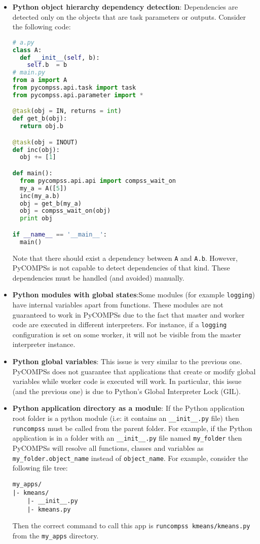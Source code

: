\begin{itemize}
\item \textbf{Python object hierarchy dependency detection}: \newline Dependencies are detected only on the objects that are task 
parameters or outputs. Consider the following code:
\begin{lstlisting}[language=python]
# a.py
class A:
  def __init__(self, b):
    self.b  = b
# main.py
from a import A
from pycompss.api.task import task
from pycompss.api.parameter import *

@task(obj = IN, returns = int)
def get_b(obj):
  return obj.b

@task(obj = INOUT)
def inc(obj):
  obj += [1]

def main():
  from pycompss.api.api import compss_wait_on
  my_a = A([5])
  inc(my_a.b)
  obj = get_b(my_a)
  obj = compss_wait_on(obj)
  print obj

if __name__ == '__main__':
  main()            
\end{lstlisting}
Note that there should exist a dependency between \verb|A| and \verb|A.b|. However, PyCOMPSs is not capable
to detect dependencies of that kind. These dependencies
must be handled (and avoided) manually.

\item \textbf{Python modules with global states}:\newline Some modules (for example \verb|logging|) have internal variables apart from functions. 
These modules are not guaranteed to work in PyCOMPSs due to the fact that master and worker code are executed in different interpreters. For instance, if a \verb|logging| configuration is set on some
worker, it will not be visible from the master interpreter instance.

\item \textbf{Python global variables}:\newline
This issue is very similar to the previous one. PyCOMPSs does not guarantee that applications that create or modify global variables while
worker code is executed will work. In particular, this issue (and the previous one) is due to Python's Global Interpreter Lock (GIL).

\item \textbf{Python application directory as a module}:\newline
If the Python application root folder is a python module (i.e: it contains an \verb|__init__.py| file) then \verb|runcompss| must be called from
the parent folder. For example, if the Python application is in a folder with an \verb|__init__.py| file named \verb|my_folder| then PyCOMPSs will
resolve all functions, classes and variables as \verb|my_folder.object_name| instead of \verb|object_name|. For example, consider the following file
tree:
\begin{lstlisting}[]
my_apps/
|- kmeans/
    |- __init__.py
    |- kmeans.py
\end{lstlisting}
Then the correct command to call this app is \verb|runcompss kmeans/kmeans.py| from the \verb|my_apps| directory.


\end{itemize}
